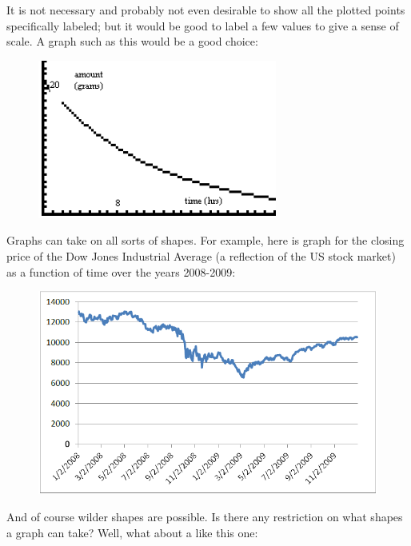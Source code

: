 {	It is not necessary and probably not even desirable to show all the plotted points specifically labeled; but it would be good to label a few values to give a sense of scale. A graph such as this would be a good choice:

	\begin{figure}[H]
		\centering
		\includegraphics[scale=1.0]{Sections/FunctionsandGraphsImages/Figure15.png}
	\end{figure}
}

Graphs can take on all sorts of shapes. For example, here is graph for the closing price of the Dow Jones Industrial Average (a reflection of the US stock market) as a function of time over the years 2008-2009:

\begin{figure}[H]
	\centering
	\includegraphics[scale=1.0]{Sections/FunctionsandGraphsImages/Figure16.png}
\end{figure}

And of course wilder shapes are possible. Is there any restriction on what shapes a graph can take? Well, what about a  like this one:

